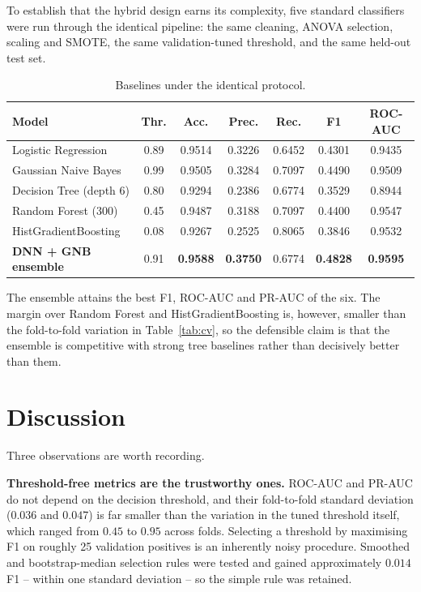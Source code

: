 \documentclass[11pt]{article}
\begin{document}
To establish that the hybrid design earns its complexity, five standard
classifiers were run through the identical pipeline: the same cleaning, ANOVA
selection, scaling and SMOTE, the same validation-tuned threshold, and the same
held-out test set.

\begin{table}[H]
    \centering
    \small
    \caption{Baselines under the identical protocol.}
    \label{tab:baselines}
    \begin{tabular}{lcccccc}
        \toprule
        \textbf{Model} & \textbf{Thr.} & \textbf{Acc.} & \textbf{Prec.} & \textbf{Rec.} & \textbf{F1} & \textbf{ROC-AUC} \\
        \midrule
        Logistic Regression      & 0.89 & 0.9514 & 0.3226 & 0.6452 & 0.4301 & 0.9435 \\
        Gaussian Naive Bayes     & 0.99 & 0.9505 & 0.3284 & 0.7097 & 0.4490 & 0.9509 \\
        Decision Tree (depth 6)  & 0.80 & 0.9294 & 0.2386 & 0.6774 & 0.3529 & 0.8944 \\
        Random Forest (300)      & 0.45 & 0.9487 & 0.3188 & 0.7097 & 0.4400 & 0.9547 \\
        HistGradientBoosting     & 0.08 & 0.9267 & 0.2525 & 0.8065 & 0.3846 & 0.9532 \\
        \midrule
        \textbf{DNN + GNB ensemble} & 0.91 & \textbf{0.9588} & \textbf{0.3750} & 0.6774 & \textbf{0.4828} & \textbf{0.9595} \\
        \bottomrule
    \end{tabular}
\end{table}

The ensemble attains the best F1, ROC-AUC and PR-AUC of the six. The margin
over Random Forest and HistGradientBoosting is, however, smaller than the
fold-to-fold variation in Table~\ref{tab:cv}, so the defensible claim is that
the ensemble is competitive with strong tree baselines rather than decisively
better than them.

\section{Discussion}

Three observations are worth recording.

\textbf{Threshold-free metrics are the trustworthy ones.} ROC-AUC and PR-AUC do
not depend on the decision threshold, and their fold-to-fold standard deviation
($0.036$ and $0.047$) is far smaller than the variation in the tuned threshold
itself, which ranged from $0.45$ to $0.95$ across folds. Selecting a threshold
by maximising F1 on roughly 25 validation positives is an inherently noisy
procedure. Smoothed and bootstrap-median selection rules were tested and gained
approximately $0.014$ F1 -- within one standard deviation -- so the simple rule
was retained.
\end{document}
